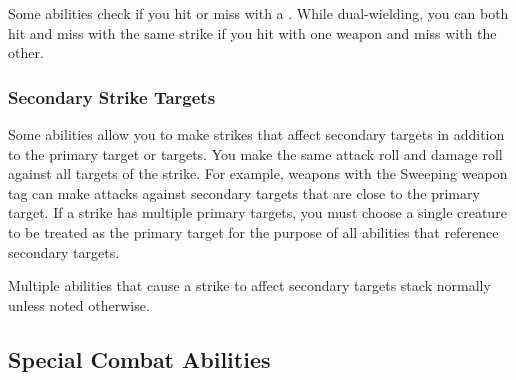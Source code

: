             Some abilities check if you hit or miss with a .
            While dual-wielding, you can both hit and miss with the same strike if you hit with one weapon and miss with the other.

        \subsubsection{Secondary Strike Targets}\label{Secondary Strike Targets}
            Some abilities allow you to make strikes that affect secondary targets in addition to the primary target or targets.
            You make the same attack roll and damage roll against all targets of the strike.
            For example, weapons with the Sweeping weapon tag can make attacks against secondary targets that are close to the primary target.
            If a strike has multiple primary targets, you must choose a single creature to be treated as the primary target for the purpose of all abilities that reference secondary targets.

            Multiple abilities that cause a strike to affect secondary targets stack normally unless noted otherwise.

    \subsection{Special Combat Abilities}\label{Special Combat Abilities}


